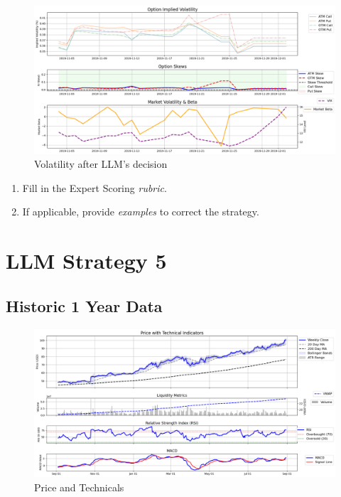 \documentclass[8pt]{scrartcl}
\begin{document}
\begin{figure}[H]
    \centering
    \includegraphics[width=1\linewidth]{judge_reviews/TSLA_M_gpt-4o-mini/2019-11-04/llm_Market_Volatility_&_Beta.png}
    \caption{Volatility after LLM's decision}
\end{figure}

\begin{tcolorbox}[colback=blue!10, colframe=blue!60, title=\textbf{TASKS}, sharp corners=southwest]
\begin{enumerate}
    \item Fill in the Expert Scoring \textit{rubric}.
    \item If applicable, provide \textit{examples} to correct the strategy.
\end{enumerate}
\end{tcolorbox}
\newpage


\section*{LLM Strategy 5}
\label{app:s5}

\subsection*{Historic 1 Year Data}

\begin{figure}[H]
    \centering
    \includegraphics[width=1\linewidth]{judge_reviews//AMZN_M_gpt-4o-mini/2018-09-03/judge_Price_with_Technical_Indicators.png}
    \caption{Price and Technicals}
\end{figure}
\end{document}
